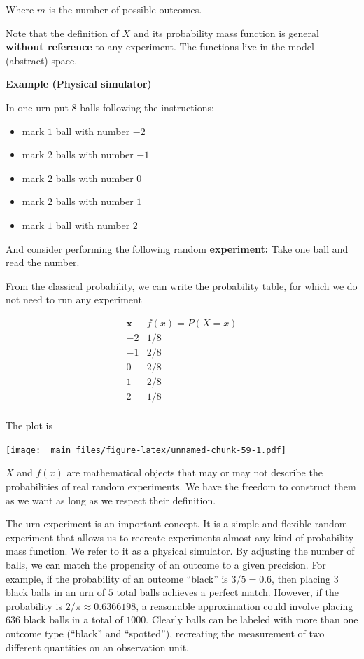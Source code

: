 \documentclass[
]{book}
\providecommand{\tightlist}{%
  \setlength{\itemsep}{0pt}\setlength{\parskip}{0pt}}
\begin{document}
Where \(m\) is the number of possible outcomes.

Note that the definition of \(X\) and its probability mass function is general \textbf{without reference} to any experiment. The functions live in the model (abstract) space.

\textbf{Example (Physical simulator)}

In one urn put \(8\) balls following the instructions:

\begin{itemize}
\tightlist
\item
  mark \(1\) ball with number \(-2\)
\item
  mark \(2\) balls with number \(-1\)
\item
  mark \(2\) balls with number \(0\)
\item
  mark \(2\) balls with number \(1\)
\item
  mark \(1\) ball with number \(2\)
\end{itemize}

And consider performing the following random \textbf{experiment:} Take one ball and read the number.

From the classical probability, we can write the probability table, for which we do not need to run any experiment

\[
\begin{array}{cc}
\mathbf{x} & f(x)=P(X=x) \\
-2 & 1/8 \\
-1 & 2/8\\
0 & 2/8 \\
1 & 2/8 \\
2 & 1/8 \\
\end{array}
\]

The plot is

\texttt{[image: \_main\_files/figure-latex/unnamed-chunk-59-1.pdf]}

\(X\) and \(f(x)\) are mathematical objects that may or may not describe the probabilities of real random experiments. We have the freedom to construct them as we want as long as we respect their definition.

The urn experiment is an important concept. It is a simple and flexible random experiment that allows us to recreate experiments almost any kind of probability mass function. We refer to it as a physical simulator. By adjusting the number of balls, we can match the propensity of an outcome to a given precision. For example, if the probability of an outcome ``black'' is \(3/5 = 0.6\), then placing \(3\) black balls in an urn of \(5\) total balls achieves a perfect match. However, if the probability is \(2/\pi \approx 0.6366198\), a reasonable approximation could involve placing \(636\) black balls in a total of \(1000\). Clearly balls can be labeled with more than one outcome type (``black'' and ``spotted''), recreating the measurement of two different quantities on an observation unit.
\end{document}

